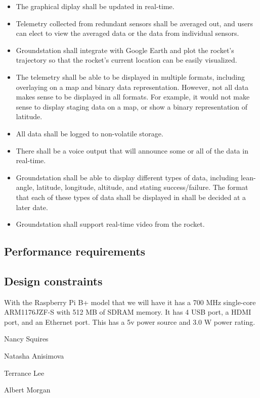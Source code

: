 \documentclass[10pt,journal,draftclsnofoot,onecolumn]{IEEEtran}
\begin{document}
	\begin{itemize}
		\item The graphical diplay shall be updated in real-time.
		\item Telemetry collected from redundant sensors shall be averaged out, and users can elect to view the averaged data or the data from individual sensors.
		\item Groundstation shall integrate with Google Earth and plot the rocket's trajectory so that the rocket's current location can be easily visualized.
		\item The telemetry shall be able to be displayed in multiple formats, including overlaying on a map and binary data representation.
		However, not all data makes sense to be displayed in all formats.
		For example, it would not make sense to display staging data on a map, or show a binary representation of latitude.
		\item All data shall be logged to non-volatile storage.
		\item There shall be a voice output that will announce some or all of the data in real-time.
		\item Groundstation shall be able to display different types of data, including lean-angle, latitude, longitude, altitude, and stating success/failure. The format that each of these types of data shall be displayed in shall be decided at a later date.
		\item Groundstation shall support real-time video from the rocket.
	\end{itemize}
	
	\subsection{Performance requirements}
	\subsection{Design constraints}
	With the Raspberry Pi B+ model that we will have it has a 700 MHz single-core ARM1176JZF-S with 512 MB of SDRAM memory.  It has 4 USB port, a HDMI port, and an Ethernet port.  This has a 5v power source and 3.0 W power rating.

	
	
	\begin{minipage}{\textwidth}
	
	\vspace{1in}
	\noindent Nancy Squires
	
	\vspace{1in}
	\noindent Natasha Anisimova
	
	\vspace{1in}
	\noindent Terrance Lee
	
	\vspace{1in}
	\noindent Albert Morgan\\
	
\end{minipage}
\end{document}
